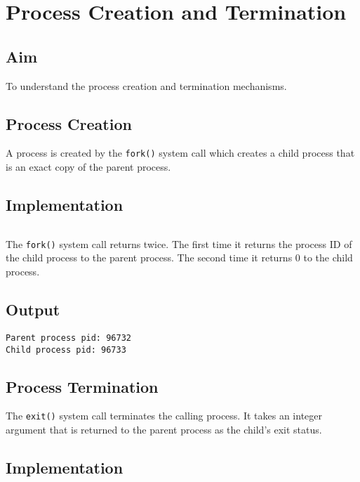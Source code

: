 \section{Process Creation and Termination}
\label{sec:process-creation-and-termination}

\subsection{Aim}
To understand the process creation and termination mechanisms.

\subsection*{Process Creation}
\label{sec:process-creation}

A process is created by the \texttt{fork()} system call
which creates a child process that is an exact copy of the parent process.

\subsection*{Implementation}

\inputminted[fontsize=\footnotesize,autogobble]{c}{code/fork.c}

The \texttt{fork()} system call returns twice.
The first time it returns the process ID of the child process to the parent process.
The second time it returns 0 to the child process.

\subsection*{Output}

\begin{lstlisting}[style=output]
Parent process pid: 96732
Child process pid: 96733    
\end{lstlisting}

\subsection*{Process Termination}
\label{sec:process-termination}

The \texttt{exit()} system call terminates the calling process.
It takes an integer argument that is returned to the
parent process as the child's exit status.

\subsection*{Implementation}
\inputminted[fontsize=\footnotesize,autogobble]{c}{code/exit.c}


